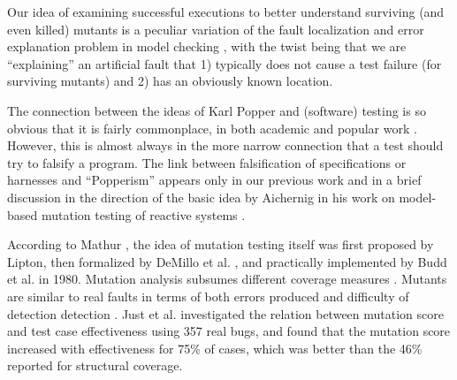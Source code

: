 \documentclass{svjour3}
\begin{document}
Our idea of examining successful executions to better understand
surviving (and even killed) mutants is a peculiar variation of the
fault localization and error explanation problem in model checking
\cite{GroceDist}, with the twist being that we are ``explaining'' an
artificial fault that 1) typically does not cause a test failure (for
surviving mutants) and 2) has an obviously known location.

The connection between the ideas of Karl Popper and (software) testing
is so obvious that it is fairly commonplace, in both academic and
popular work \cite{kaner}.  However, this is almost always in the more
narrow connection that a test should try to falsify a program.  The
link between falsification of specifications or harnesses and
``Popperism'' appears only in our previous work \cite{ase15} and in a
brief discussion in the direction
of the basic idea by Aichernig in his work on model-based mutation testing
of reactive systems \cite{aichernig2013model}.

According to Mathur \cite{mathur2012foundations}, the idea of mutation
testing itself was first proposed by 
Lipton, then formalized by DeMillo et
al. \cite{PracProg}, and practically implemented by
Budd et al. \cite{budd1980theoretical} in 1980.
Mutation analysis subsumes different coverage
measures \cite{budd1980mutation,mathur1994empirical,offutt1996subsumption}.
Mutants are
similar to real faults in terms of both errors
produced \cite{daran1996software} and difficulty of detection
detection \cite{mutant,andrews2006using}. Just et
al. \cite{justmutants} investigated the relation between mutation
score and test case effectiveness using 357 real bugs, and found that
the mutation score increased with effectiveness for 75\% of cases,
which was better than the 46\% reported for structural coverage.

\end{document}
